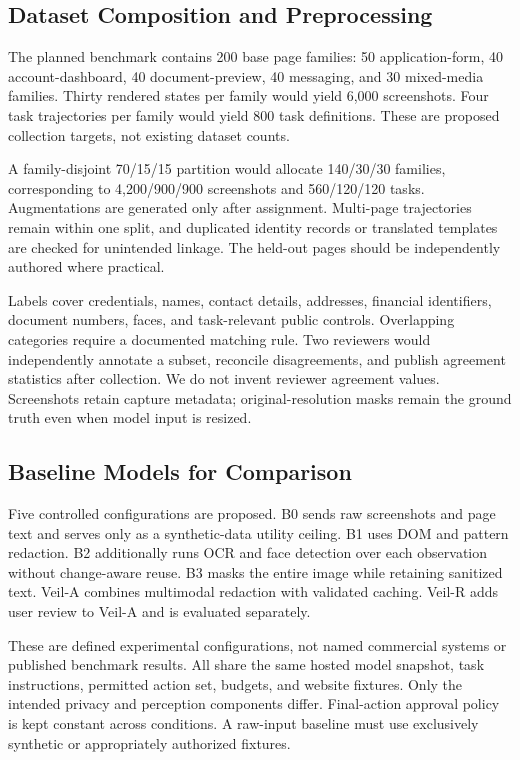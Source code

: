 \documentclass[conference]{IEEEtran}
\begin{document}
\subsection{Dataset Composition and Preprocessing}
The planned benchmark contains 200 base page families: 50 application-form, 40 account-dashboard, 40 document-preview, 40 messaging, and 30 mixed-media families. Thirty rendered states per family would yield 6,000 screenshots. Four task trajectories per family would yield 800 task definitions. These are proposed collection targets, not existing dataset counts.

A family-disjoint 70/15/15 partition would allocate 140/30/30 families, corresponding to 4,200/900/900 screenshots and 560/120/120 tasks. Augmentations are generated only after assignment. Multi-page trajectories remain within one split, and duplicated identity records or translated templates are checked for unintended linkage. The held-out pages should be independently authored where practical.

Labels cover credentials, names, contact details, addresses, financial identifiers, document numbers, faces, and task-relevant public controls. Overlapping categories require a documented matching rule. Two reviewers would independently annotate a subset, reconcile disagreements, and publish agreement statistics after collection. We do not invent reviewer agreement values. Screenshots retain capture metadata; original-resolution masks remain the ground truth even when model input is resized.

\subsection{Baseline Models for Comparison}
Five controlled configurations are proposed. B0 sends raw screenshots and page text and serves only as a synthetic-data utility ceiling. B1 uses DOM and pattern redaction. B2 additionally runs OCR and face detection over each observation without change-aware reuse. B3 masks the entire image while retaining sanitized text. Veil-A combines multimodal redaction with validated caching. Veil-R adds user review to Veil-A and is evaluated separately.

These are defined experimental configurations, not named commercial systems or published benchmark results. All share the same hosted model snapshot, task instructions, permitted action set, budgets, and website fixtures. Only the intended privacy and perception components differ. Final-action approval policy is kept constant across conditions. A raw-input baseline must use exclusively synthetic or appropriately authorized fixtures.
\end{document}
